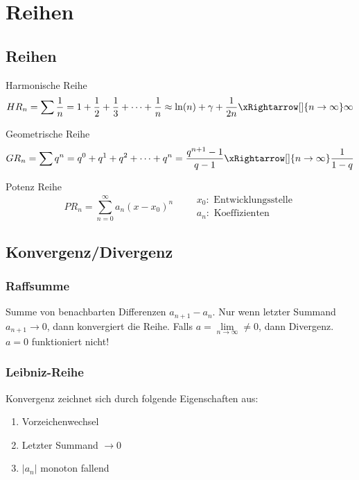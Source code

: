 \section{Reihen}
\subsection{Reihen }
\noindent Harmonische Reihe
\[
HR_n = \sum \frac{1}{n} = 1 + \frac{1}{2} + \frac{1}{3} + \dots + \frac{1}{n} \approx \ln(n) + \gamma + \frac{1}{2n} \xRightarrow[]{n\rightarrow\infty}\infty
\]

\noindent Geometrische Reihe
\[
GR_n = \sum q^n = q^0 + q^1 + q^2 + \cdots + q^n = \frac{q^{n+1}-1}{q-1} \xRightarrow[]{n\rightarrow\infty}\frac{1}{1-q}
\]

\noindent Potenz Reihe\label{potenzreihe}
\[
PR_n = \sum\limits_{n=0}^{\infty} a_n(x -x_0)^n \qquad \begin{array}{ll}
	 x_0: \text{ Entwicklungsstelle} \\
	 a_n: \text{ Koeffizienten}
\end{array}
\]

\subsection{Konvergenz/Divergenz}
\subsubsection{Raffsumme}
Summe von benachbarten Differenzen $a_{n+1} - a_n$. Nur wenn letzter Summand $a_{n+1} \rightarrow 0$, dann konvergiert die Reihe.
Falls $a = \lim\limits_{n \rightarrow \infty} \neq 0$, dann Divergenz. $a=0$ funktioniert nicht!

\subsubsection{Leibniz-Reihe}
Konvergenz zeichnet sich durch folgende Eigenschaften aus:
\begin{enumerate}[nosep]
	\item Vorzeichenwechsel
	\item Letzter Summand $\rightarrow 0$
	\item $\left|a_n\right|$ monoton fallend
\end{enumerate}

